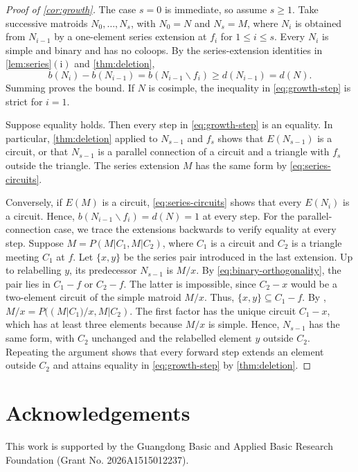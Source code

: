 \documentclass[11pt]{article}
\numberwithin{equation}{section}
\begin{document}
\begin{proof}[Proof of \autoref{cor:growth}]
The case \(s=0\) is immediate, so assume \(s\ge1\).
Take successive matroids \(N_0,\ldots,N_s\), with \(N_0=N\) and \(N_s=M\),
where \(N_i\) is obtained from \(N_{i-1}\) by a one-element series
extension at \(f_i\) for \(1\le i\le s\).
Every \(N_i\) is simple and binary and has no coloops.
By the series-extension identities in \autoref{lem:series}\(\mathrm{(i)}\)
and \autoref{thm:deletion},
\begin{equation}\label{eq:growth-step}
 b(N_i)-b(N_{i-1})=b(N_{i-1}\backslash f_i)
 \ge d(N_{i-1})=d(N).
\end{equation}
Summing proves the bound. If \(N\) is cosimple,
the inequality in \eqref{eq:growth-step} is strict for \(i=1\).

Suppose equality holds. Then every step in \eqref{eq:growth-step}
is an equality. In particular, \autoref{thm:deletion} applied to
\(N_{s-1}\) and \(f_s\) shows that \(E(N_{s-1})\) is a circuit, or that
\(N_{s-1}\) is a parallel connection of a circuit and a triangle with
\(f_s\) outside the triangle. The series extension \(M\) has the same
form by \eqref{eq:series-circuits}.

Conversely, if \(E(M)\) is a circuit, \eqref{eq:series-circuits} shows that
every \(E(N_i)\) is a circuit. Hence,
\(b(N_{i-1}\backslash f_i)=d(N)=1\) at every step.
For the parallel-connection case, we trace the extensions backwards
to verify equality at every step.
Suppose \(M=P(M|C_1,M|C_2)\), where \(C_1\) is a circuit
and \(C_2\) is a triangle meeting \(C_1\) at \(f\).
Let \(\{x,y\}\) be the series pair introduced in the last extension.
Up to relabelling \(y\), its predecessor \(N_{s-1}\) is \(M/x\).
By \eqref{eq:binary-orthogonality}, the pair lies in
\(C_1-f\) or \(C_2-f\). The latter is impossible, since
\(C_2-x\) would be a two-element circuit of the simple matroid \(M/x\).
Thus, \(\{x,y\}\subseteq C_1-f\). By
\cite[Proposition~7.1.15(v)]{Oxley2011},
\(M/x=P((M|C_1)/x,M|C_2)\).
The first factor has the unique circuit \(C_1-x\), which has at least
three elements because \(M/x\) is simple.
Hence, \(N_{s-1}\) has the same form, with \(C_2\) unchanged
and the relabelled element \(y\) outside \(C_2\).
Repeating the argument shows that every forward step extends an
element outside \(C_2\) and attains equality in \eqref{eq:growth-step}
by \autoref{thm:deletion}.
\end{proof}
\section*{Acknowledgements}
This work is supported by the Guangdong Basic and Applied Basic Research Foundation (Grant No. 2026A1515012237).
\end{document}
